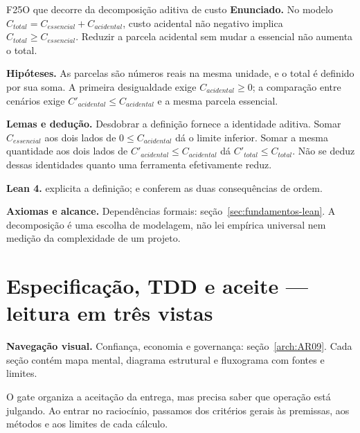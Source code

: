 \begin{formalizacao}{F25}{O que decorre da decomposição aditiva de custo}
\textbf{Enunciado.} No modelo $C_{total}=C_{essencial}+C_{acidental}$, custo acidental não negativo implica $C_{total}\geq C_{essencial}$. Reduzir a parcela acidental sem mudar a essencial não aumenta o total.

\textbf{Hipóteses.} As parcelas são números reais na mesma unidade, e o total é definido por sua soma. A primeira desigualdade exige $C_{acidental}\geq0$; a comparação entre cenários exige $C'_{acidental}\leq C_{acidental}$ e a mesma parcela essencial.

\textbf{Lemas e dedução.} Desdobrar a definição fornece a identidade aditiva. Somar $C_{essencial}$ aos dois lados de $0\leq C_{acidental}$ dá o limite inferior. Somar a mesma quantidade aos dois lados de $C'_{acidental}\leq C_{acidental}$ dá $C'_{total}\leq C_{total}$. Não se deduz dessas identidades quanto uma ferramenta efetivamente reduz.

\textbf{Lean 4.}  explicita a definição;  e  conferem as duas consequências de ordem.

\textbf{Axiomas e alcance.} Dependências formais: seção~\ref{sec:fundamentos-lean}. A decomposição é uma escolha de modelagem, não lei empírica universal nem medição da complexidade de um projeto.
\end{formalizacao}


\clearpage\section{Especificação, TDD e aceite — leitura em três vistas}\label{arch:AR08}




\begin{descricao}\textbf{Navegação visual.} Confiança, economia e governança: seção~\ref{arch:AR09}. Cada seção contém mapa mental, diagrama estrutural e fluxograma com fontes e limites.\end{descricao}


O gate organiza a aceitação da entrega, mas precisa saber que operação está julgando. Ao entrar no raciocínio, passamos dos critérios gerais às premissas, aos métodos e aos limites de cada cálculo.
